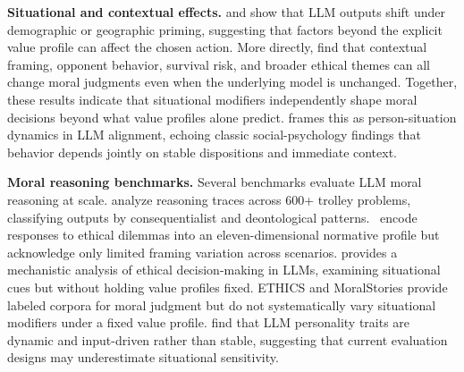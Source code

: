\documentclass[11pt]{article}
\begin{document}
\textbf{Situational and contextual effects.}
\citet{santurkar2023whose} and \citet{durmus2023globalopinionqa} show that LLM outputs shift under demographic or geographic priming, suggesting that factors beyond the explicit value profile can affect the chosen action. More directly, \citet{sauter2026between,nabizadeh2026large,backmann2025ethics} find that contextual framing, opponent behavior, survival risk, and broader ethical themes can all change moral judgments even when the underlying model is unchanged. Together, these results indicate that situational modifiers independently shape moral decisions beyond what value profiles alone predict.
\citet{peterson2025context} frames this as person-situation dynamics in LLM alignment, echoing classic social-psychology findings that behavior depends jointly on stable dispositions and immediate context.

\textbf{Moral reasoning benchmarks.}
Several benchmarks evaluate LLM moral reasoning at scale. \citet{samway2025language} analyze reasoning traces across 600+ trolley problems,
classifying outputs by consequentialist and deontological patterns. \citet{mahajan2025mapping}\ encode responses to
ethical dilemmas into an eleven-dimensional normative profile but
acknowledge only limited framing variation across scenarios. \citet{schacht2025mapping} provides a mechanistic
analysis of ethical decision-making in LLMs, examining situational cues
but without holding value profiles fixed.
ETHICS \citep{hendrycks2021ethics} and MoralStories \citep{emelin2021moral}
provide labeled corpora for moral judgment but do not systematically
vary situational modifiers under a fixed value profile. \citet{jiaqi2025comparative} find that LLM personality traits are dynamic and input-driven
rather than stable, suggesting that
current evaluation designs may underestimate situational sensitivity.

\end{document}
